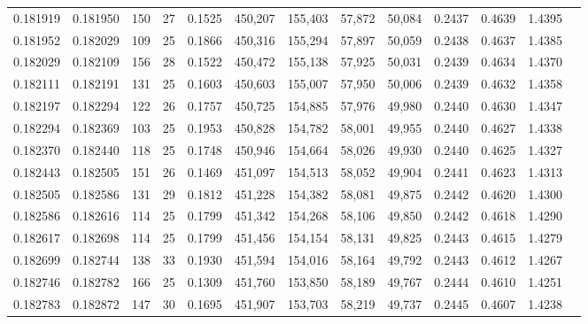 \begin{tabular}{rrrrrrrrrrrrr}
0.181919 & 0.181950 & 150 &  27 &                                     0.1525 & 450,207 & 155,403 &  57,872 &  50,084 & 0.2437 & 0.4639 & 1.4395 \\
0.181952 & 0.182029 & 109 &  25 &                                     0.1866 & 450,316 & 155,294 &  57,897 &  50,059 & 0.2438 & 0.4637 & 1.4385 \\
0.182029 & 0.182109 & 156 &  28 &                                     0.1522 & 450,472 & 155,138 &  57,925 &  50,031 & 0.2439 & 0.4634 & 1.4370 \\
0.182111 & 0.182191 & 131 &  25 &                                     0.1603 & 450,603 & 155,007 &  57,950 &  50,006 & 0.2439 & 0.4632 & 1.4358 \\
0.182197 & 0.182294 & 122 &  26 &                                     0.1757 & 450,725 & 154,885 &  57,976 &  49,980 & 0.2440 & 0.4630 & 1.4347 \\
0.182294 & 0.182369 & 103 &  25 &                                     0.1953 & 450,828 & 154,782 &  58,001 &  49,955 & 0.2440 & 0.4627 & 1.4338 \\
0.182370 & 0.182440 & 118 &  25 &                                     0.1748 & 450,946 & 154,664 &  58,026 &  49,930 & 0.2440 & 0.4625 & 1.4327 \\
0.182443 & 0.182505 & 151 &  26 &                                     0.1469 & 451,097 & 154,513 &  58,052 &  49,904 & 0.2441 & 0.4623 & 1.4313 \\
0.182505 & 0.182586 & 131 &  29 &                                     0.1812 & 451,228 & 154,382 &  58,081 &  49,875 & 0.2442 & 0.4620 & 1.4300 \\
0.182586 & 0.182616 & 114 &  25 &                                     0.1799 & 451,342 & 154,268 &  58,106 &  49,850 & 0.2442 & 0.4618 & 1.4290 \\
0.182617 & 0.182698 & 114 &  25 &                                     0.1799 & 451,456 & 154,154 &  58,131 &  49,825 & 0.2443 & 0.4615 & 1.4279 \\
0.182699 & 0.182744 & 138 &  33 &                                     0.1930 & 451,594 & 154,016 &  58,164 &  49,792 & 0.2443 & 0.4612 & 1.4267 \\
0.182746 & 0.182782 & 166 &  25 &                                     0.1309 & 451,760 & 153,850 &  58,189 &  49,767 & 0.2444 & 0.4610 & 1.4251 \\
0.182783 & 0.182872 & 147 &  30 &                                     0.1695 & 451,907 & 153,703 &  58,219 &  49,737 & 0.2445 & 0.4607 & 1.4238 \\

\end{tabular}
